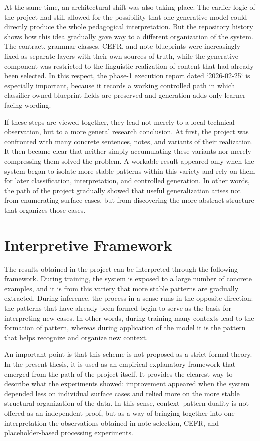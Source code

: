 \documentclass[12pt,a4paper,oneside]{report}
\begin{document}
At the same time, an architectural shift was also taking place. The earlier logic of the project had still allowed for the possibility that one generative model could directly produce the whole pedagogical interpretation. But the repository history shows how this idea gradually gave way to a different organization of the system. The contract, grammar classes, CEFR, and note blueprints were increasingly fixed as separate layers with their own sources of truth, while the generative component was restricted to the linguistic realization of content that had already been selected. In this respect, the phase-1 execution report dated `2026-02-25` is especially important, because it records a working controlled path in which classifier-owned blueprint fields are preserved and generation adds only learner-facing wording.

If these steps are viewed together, they lead not merely to a local technical observation, but to a more general research conclusion. At first, the project was confronted with many concrete sentences, notes, and variants of their realization. It then became clear that neither simply accumulating these variants nor merely compressing them solved the problem. A workable result appeared only when the system began to isolate more stable patterns within this variety and rely on them for later classification, interpretation, and controlled generation. In other words, the path of the project gradually showed that useful generalization arises not from enumerating surface cases, but from discovering the more abstract structure that organizes those cases.

\section{Interpretive Framework}

The results obtained in the project can be interpreted through the following framework. During training, the system is exposed to a large number of concrete examples, and it is from this variety that more stable patterns are gradually extracted. During inference, the process in a sense runs in the opposite direction: the patterns that have already been formed begin to serve as the basis for interpreting new cases. In other words, during training many contexts lead to the formation of pattern, whereas during application of the model it is the pattern that helps recognize and organize new context.

An important point is that this scheme is not proposed as a strict formal theory. In the present thesis, it is used as an empirical explanatory framework that emerged from the path of the project itself. It provides the clearest way to describe what the experiments showed: improvement appeared when the system depended less on individual surface cases and relied more on the more stable structural organization of the data. In this sense, context--pattern duality is not offered as an independent proof, but as a way of bringing together into one interpretation the observations obtained in note-selection, CEFR, and placeholder-based processing experiments.
\end{document}
